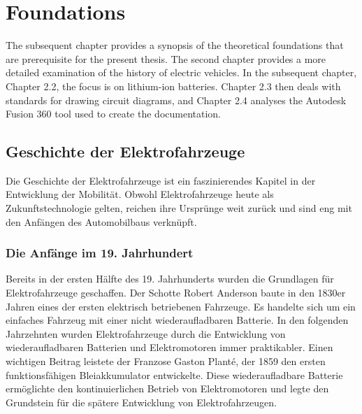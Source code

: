 \chapter{Foundations}
\label{cha:Grundlagen}



The subsequent chapter provides a synopsis of the theoretical foundations that are prerequisite for the present thesis. The second chapter provides a more detailed examination of the history of electric vehicles. In the subsequent chapter, Chapter 2.2, the focus is on lithium-ion batteries. Chapter 2.3 then deals with standards for drawing circuit diagrams, and Chapter 2.4 analyses the Autodesk Fusion 360 tool used to create the documentation.
\section{Geschichte der Elektrofahrzeuge}

Die Geschichte der Elektrofahrzeuge ist ein faszinierendes Kapitel in der Entwicklung der Mobilität. Obwohl Elektrofahrzeuge heute als Zukunftstechnologie gelten, reichen ihre Ursprünge weit zurück und sind eng mit den Anfängen des Automobilbaus verknüpft.

\subsection*{Die Anfänge im 19. Jahrhundert}

Bereits in der ersten Hälfte des 19. Jahrhunderts wurden die Grundlagen für Elektrofahrzeuge geschaffen. Der Schotte Robert Anderson baute in den 1830er Jahren eines der ersten elektrisch betriebenen Fahrzeuge. Es handelte sich um ein einfaches Fahrzeug mit einer nicht wiederaufladbaren Batterie. In den folgenden Jahrzehnten wurden Elektrofahrzeuge durch die Entwicklung von wiederaufladbaren Batterien und Elektromotoren immer praktikabler.\autocite{vattenfall_elektroauto_geschichte} 
Einen wichtigen Beitrag leistete der Franzose Gaston Planté, der 1859 den ersten funktionsfähigen Bleiakkumulator entwickelte. Diese wiederaufladbare Batterie ermöglichte den kontinuierlichen Betrieb von Elektromotoren und legte den Grundstein für die spätere Entwicklung von Elektrofahrzeugen. \autocite{cosmos_gaston_plante}

